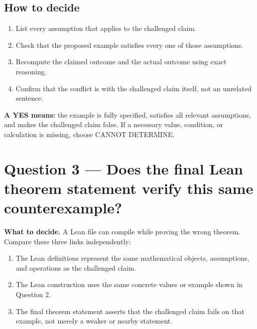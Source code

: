 \documentclass[11pt]{article}
\begin{document}
\subsection*{How to decide}
\begin{enumerate}
\item List every assumption that applies to the challenged claim.
\item Check that the proposed example satisfies every one of those assumptions.
\item Recompute the claimed outcome and the actual outcome using exact reasoning.
\item Confirm that the conflict is with the challenged claim itself, not an unrelated sentence.
\end{enumerate}
\textbf{A YES means:} the example is fully specified, satisfies all relevant assumptions, and makes the challenged claim false. If a necessary value, condition, or calculation is missing, choose CANNOT DETERMINE.
\section*{Question 3 --- Does the final Lean theorem statement verify this same counterexample?}
\textbf{What to decide.} A Lean file can compile while proving the wrong theorem. Compare these three links independently:
\begin{enumerate}
\item The Lean definitions represent the same mathematical objects, assumptions, and operations as the challenged claim.
\item The Lean construction uses the same concrete values or example shown in Question 2.
\item The final theorem statement asserts that the challenged claim fails on that example, not merely a weaker or nearby statement.
\end{enumerate}
\end{document}
